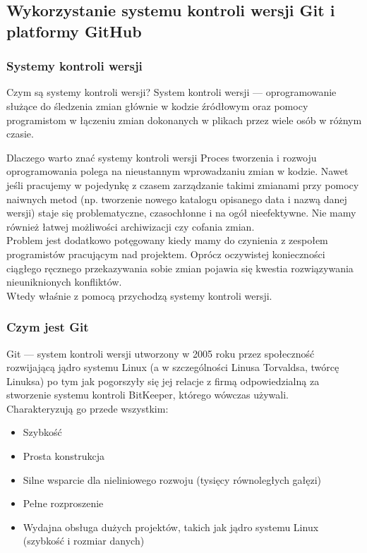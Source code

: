 \newpage

\subsection{Wykorzystanie systemu kontroli wersji Git i platformy GitHub}

\subsubsection[Systemy kontroli wersji]{Systemy kontroli wersji~\cite{ProGit}}

Czym są systemy kontroli wersji?
System kontroli wersji — oprogramowanie służące do śledzenia zmian głównie w kodzie źródłowym oraz pomocy programistom w łączeniu zmian dokonanych w plikach przez wiele osób w różnym czasie.

Dlaczego warto znać systemy kontroli wersji
Proces tworzenia i rozwoju oprogramowania polega na nieustannym wprowadzaniu zmian w kodzie. Nawet jeśli pracujemy w pojedynkę z czasem zarządzanie takimi zmianami przy pomocy naiwnych metod (np. tworzenie nowego katalogu opisanego data i nazwą danej \\ wersji) staje się problematyczne, czasochłonne i na ogół nieefektywne. Nie mamy również łatwej możliwości archiwizacji czy cofania zmian. \\ Problem jest dodatkowo potęgowany kiedy mamy do czynienia z zespołem programistów pracującym nad projektem. Oprócz oczywistej konieczności ciągłego ręcznego przekazywania sobie zmian pojawia się kwestia rozwiązywania nieuniknionych konfliktów. \\ Wtedy właśnie z pomocą przychodzą systemy kontroli wersji.


\subsubsection[Czym jest Git]{Czym jest Git~\cite{ProGit}}
Git — system kontroli wersji utworzony w 2005 roku przez społeczność rozwijającą jądro systemu Linux (a w szczególności Linusa Torvaldsa, twórcę Linuksa)
po tym jak pogorszyły się jej relacje z firmą odpowiedzialną za stworzenie systemu kontroli BitKeeper, którego wówczas używali.
\\
Charakteryzują go przede wszystkim:
\begin{itemize}
  \item Szybkość
  \item Prosta konstrukcja
  \item Silne wsparcie dla nieliniowego rozwoju (tysięcy równoległych gałęzi)
  \item Pełne rozproszenie
  \item Wydajna obsługa dużych projektów, takich jak jądro systemu Linux (szybkość i rozmiar danych)
\end{itemize}

